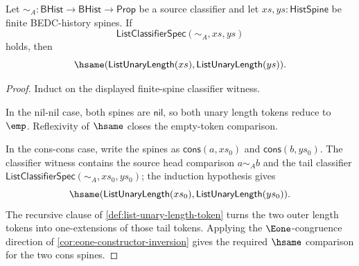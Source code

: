 \begin{theorem}
\label{thm:list-classifier-unary-length-token-hsame}
Let $\sim_A:\mathsf{BHist}\to\mathsf{BHist}\to\mathsf{Prop}$ be a source classifier and let $xs,ys:\mathsf{HistSpine}$ be finite BEDC-history spines. If
$$
\mathsf{ListClassifierSpec}(\sim_A,xs,ys)
$$
holds, then
$$
\hsame(\mathsf{ListUnaryLength}(xs),\mathsf{ListUnaryLength}(ys)).
$$
\end{theorem}
\begin{proof}
Induct on the displayed finite-spine classifier witness.

In the nil-nil case, both spines are $\mathsf{nil}$, so both unary length tokens reduce to $\emp$. Reflexivity of $\hsame$ closes the empty-token comparison.

In the cons-cons case, write the spines as $\mathsf{cons}(a,xs_0)$ and $\mathsf{cons}(b,ys_0)$. The classifier witness contains the source head comparison $a\sim_A b$ and the tail classifier $\mathsf{ListClassifierSpec}(\sim_A,xs_0,ys_0)$; the induction hypothesis gives
$$
\hsame(\mathsf{ListUnaryLength}(xs_0),\mathsf{ListUnaryLength}(ys_0)).
$$
The recursive clause of \autoref{def:list-unary-length-token} turns the two outer length tokens into one-extensions of those tail tokens. Applying the $\Eone$-congruence direction of \autoref{cor:eone-constructor-inversion} gives the required $\hsame$ comparison for the two cons spines.
\end{proof}

